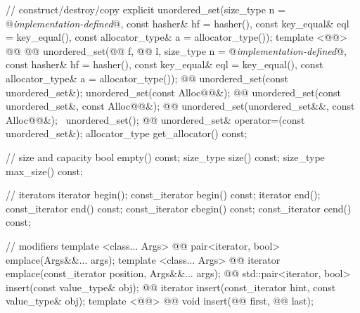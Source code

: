 \documentclass[american,twoside]{book}
\begin{document}
\begin{codeblock}
{{    // construct/destroy/copy
    explicit unordered_set(size_type n = @\textit{implementation-defined}@,
                           const hasher& hf = hasher(),
                           const key_equal& eql = key_equal(),
                           const allocator_type& a = allocator_type());
    template <@@>
      @@
            @@
      unordered_set(@@ f, @@ l,
                    size_type n = @\textit{implementation-defined}@,
                    const hasher& hf = hasher(),
                    const key_equal& eql = key_equal(),
                    const allocator_type& a = allocator_type());
    @@ 
      unordered_set(const unordered_set&);
    unordered_set(const Alloc@@&);
    @@ 
      unordered_set(const unordered_set&, const Alloc@@&);
    @@
      unordered_set(unordered_set&&, const Alloc@@&);
    ~unordered_set();
    @@
      unordered_set& operator=(const unordered_set&);
    allocator_type get_allocator() const;

    // size and capacity
    bool empty() const;
    size_type size() const;
    size_type max_size() const;

    // iterators
    iterator       begin();
    const_iterator begin() const;
    iterator       end();
    const_iterator end() const;
    const_iterator cbegin() const;
    const_iterator cend() const;

    // modifiers
    template <class... Args> 
      @@
      pair<iterator, bool> emplace(Args&&... args);
    template <class... Args> 
      @@
      iterator emplace(const_iterator position, Args&&... args);
    @@ 
      std::pair<iterator, bool> insert(const value_type& obj);
    @@ 
      iterator insert(const_iterator hint, const value_type& obj);
    template <@@> 
      @@
      void insert(@@ first, @@ last);

}}
\end{codeblock}
\end{document}

